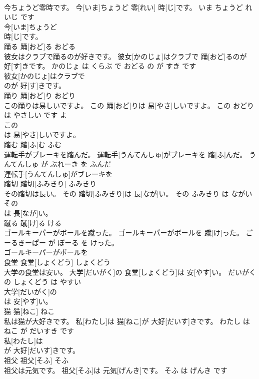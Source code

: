 \documentclass[8pt]{extreport}
\begin{document}
\begin{CJK}{UTF8}{min}
\\	今ちょうど零時です。	今[いま]ちょうど 零[れい] 時[じ]です。	いま ちょうど れいじ です	
\\	今[いま]ちょうど
\\	時[じ]です。			
\\	踊る	踊[おど]る	おどる	
\\	彼女はクラブで踊るのが好きです。	彼女[かのじょ]はクラブで 踊[おど]るのが 好[す]きです。	かのじょ は くらぶ で おどる の が すき です	
\\	彼女[かのじょ]はクラブで
\\	のが 好[す]きです。			
\\	踊り	踊[おど]り	おどり	
\\	この踊りは易しいですよ。	この 踊[おど]りは 易[やさ]しいですよ。	この おどり は やさしい です よ	
\\	この
\\	は 易[やさ]しいですよ。			
\\	踏む	踏[ふ]む	ふむ	
\\	運転手がブレーキを踏んだ。	運転手[うんてんしゅ]がブレーキを 踏[ふ]んだ。	うんてんしゅ が ぶれーき を ふんだ	
\\	運転手[うんてんしゅ]がブレーキを
\\	踏切	踏切[ふみきり]	ふみきり	
\\	その踏切は長い。	その 踏切[ふみきり]は 長[なが]い。	その ふみきり は ながい	
\\	その
\\	は 長[なが]い。			
\\	蹴る	蹴[け]る	ける	
\\	ゴールキーパーがボールを蹴った。	ゴールキーパーがボールを 蹴[け]った。	ごーるきーぱー が ぼーる を けった。	
\\	ゴールキーパーがボールを
\\	食堂	食堂[しょくどう]	しょくどう	
\\	大学の食堂は安い。	大学[だいがく]の 食堂[しょくどう]は 安[やす]い。	だいがく の しょくどう は やすい	
\\	大学[だいがく]の
\\	は 安[やす]い。			
\\	猫	猫[ねこ]	ねこ	
\\	私は猫が大好きです。	私[わたし]は 猫[ねこ]が 大好[だいす]きです。	わたし は ねこ が だいすき です	
\\	私[わたし]は
\\	が 大好[だいす]きです。			
\\	祖父	祖父[そふ]	そふ	
\\	祖父は元気です。	祖父[そふ]は 元気[げんき]です。	そふ は げんき です	

\end{CJK}
\end{document}
